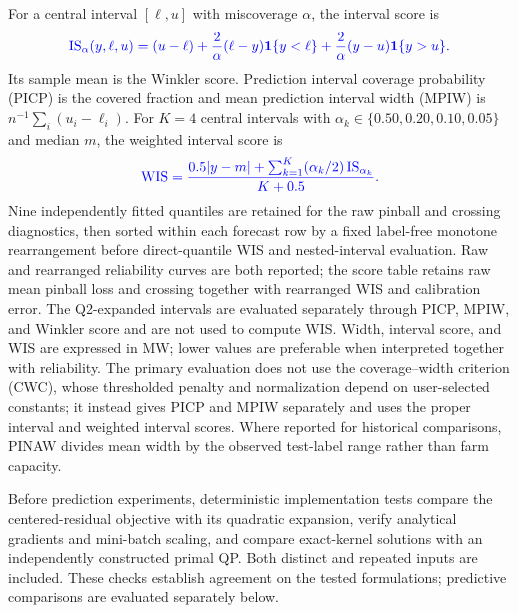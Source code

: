 \documentclass[a4paper]{cas-sc}
\begin{document}
{\color{blue}For a central interval $[\ell,u]$ with miscoverage $\alpha$, the interval score is}
\begin{equation}
{\color{blue}
\operatorname{IS}_{\alpha}(y,\ell,u)=(u-\ell)+\frac{2}{\alpha}(\ell-y)\mathbf{1}\{y<\ell\}+\frac{2}{\alpha}(y-u)\mathbf{1}\{y>u\}.}
\end{equation}
{\color{blue}Its sample mean is the Winkler score. Prediction interval coverage probability (PICP) is the covered fraction and mean prediction interval width (MPIW) is $n^{-1}\sum_i(u_i-\ell_i)$. For $K=4$ central intervals with $\alpha_k\in\{0.50,0.20,0.10,0.05\}$ and median $m$, the weighted interval score is}
\begin{equation}
{\color{blue}
\operatorname{WIS}=\frac{0.5|y-m|+\sum_{k=1}^{K}(\alpha_k/2)\operatorname{IS}_{\alpha_k}}{K+0.5}.}
\end{equation}
{\color{blue}Nine independently fitted quantiles are retained for the raw pinball and crossing diagnostics, then sorted within each forecast row by a fixed label-free monotone rearrangement \citep{chernozhukov2010rearrangement} before direct-quantile WIS and nested-interval evaluation. Raw and rearranged reliability curves are both reported; the score table retains raw mean pinball loss and crossing together with rearranged WIS and calibration error. The Q2-expanded intervals are evaluated separately through PICP, MPIW, and Winkler score and are not used to compute WIS. Width, interval score, and WIS are expressed in MW; lower values are preferable when interpreted together with reliability. The primary evaluation does not use the coverage--width criterion (CWC), whose thresholded penalty and normalization depend on user-selected constants; it instead gives PICP and MPIW separately and uses the proper interval and weighted interval scores. Where reported for historical comparisons, PINAW divides mean width by the observed test-label range rather than farm capacity.}

{\color{blue}Before prediction experiments, deterministic implementation tests compare the centered-residual objective with its quadratic expansion, verify analytical gradients and mini-batch scaling, and compare exact-kernel solutions with an independently constructed primal QP. Both distinct and repeated inputs are included. These checks establish agreement on the tested formulations; predictive comparisons are evaluated separately below.}


\end{document}
